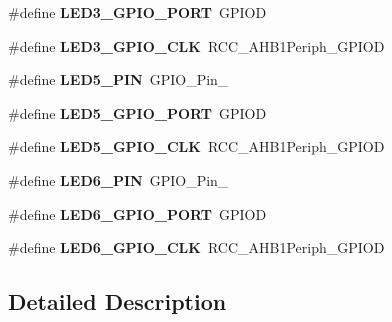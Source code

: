 \begin{DoxyCompactItemize}
\item 
\hypertarget{group___s_t_m32_f4___d_i_s_c_o_v_e_r_y___l_o_w___l_e_v_e_l___l_e_d_ga050f4b3a1f402476f9541dfe975d2143}{\#define {\bfseries L\-E\-D3\-\_\-\-G\-P\-I\-O\-\_\-\-P\-O\-R\-T}~G\-P\-I\-O\-D}\label{group___s_t_m32_f4___d_i_s_c_o_v_e_r_y___l_o_w___l_e_v_e_l___l_e_d_ga050f4b3a1f402476f9541dfe975d2143}

\item 
\hypertarget{group___s_t_m32_f4___d_i_s_c_o_v_e_r_y___l_o_w___l_e_v_e_l___l_e_d_gaf4e64981a3f4584fb771aa4cbc093c61}{\#define {\bfseries L\-E\-D3\-\_\-\-G\-P\-I\-O\-\_\-\-C\-L\-K}~R\-C\-C\-\_\-\-A\-H\-B1\-Periph\-\_\-\-G\-P\-I\-O\-D}\label{group___s_t_m32_f4___d_i_s_c_o_v_e_r_y___l_o_w___l_e_v_e_l___l_e_d_gaf4e64981a3f4584fb771aa4cbc093c61}

\item 
\hypertarget{group___s_t_m32_f4___d_i_s_c_o_v_e_r_y___l_o_w___l_e_v_e_l___l_e_d_ga1461b79814613e21bc6ebb5d8ae6e858}{\#define {\bfseries L\-E\-D5\-\_\-\-P\-I\-N}~G\-P\-I\-O\-\_\-\-Pin\-\_}\label{group___s_t_m32_f4___d_i_s_c_o_v_e_r_y___l_o_w___l_e_v_e_l___l_e_d_ga1461b79814613e21bc6ebb5d8ae6e858}

\item 
\hypertarget{group___s_t_m32_f4___d_i_s_c_o_v_e_r_y___l_o_w___l_e_v_e_l___l_e_d_gae157f2a0e9c947288518e6124b82aa74}{\#define {\bfseries L\-E\-D5\-\_\-\-G\-P\-I\-O\-\_\-\-P\-O\-R\-T}~G\-P\-I\-O\-D}\label{group___s_t_m32_f4___d_i_s_c_o_v_e_r_y___l_o_w___l_e_v_e_l___l_e_d_gae157f2a0e9c947288518e6124b82aa74}

\item 
\hypertarget{group___s_t_m32_f4___d_i_s_c_o_v_e_r_y___l_o_w___l_e_v_e_l___l_e_d_ga8c3cfa11e4916d221e3fc2fc9e24f19e}{\#define {\bfseries L\-E\-D5\-\_\-\-G\-P\-I\-O\-\_\-\-C\-L\-K}~R\-C\-C\-\_\-\-A\-H\-B1\-Periph\-\_\-\-G\-P\-I\-O\-D}\label{group___s_t_m32_f4___d_i_s_c_o_v_e_r_y___l_o_w___l_e_v_e_l___l_e_d_ga8c3cfa11e4916d221e3fc2fc9e24f19e}

\item 
\hypertarget{group___s_t_m32_f4___d_i_s_c_o_v_e_r_y___l_o_w___l_e_v_e_l___l_e_d_ga671c4f0e7ed8fbbfecc92cf6bdd0d588}{\#define {\bfseries L\-E\-D6\-\_\-\-P\-I\-N}~G\-P\-I\-O\-\_\-\-Pin\-\_}\label{group___s_t_m32_f4___d_i_s_c_o_v_e_r_y___l_o_w___l_e_v_e_l___l_e_d_ga671c4f0e7ed8fbbfecc92cf6bdd0d588}

\item 
\hypertarget{group___s_t_m32_f4___d_i_s_c_o_v_e_r_y___l_o_w___l_e_v_e_l___l_e_d_ga60dcbcf75e3ee091c1512f6ca9e00722}{\#define {\bfseries L\-E\-D6\-\_\-\-G\-P\-I\-O\-\_\-\-P\-O\-R\-T}~G\-P\-I\-O\-D}\label{group___s_t_m32_f4___d_i_s_c_o_v_e_r_y___l_o_w___l_e_v_e_l___l_e_d_ga60dcbcf75e3ee091c1512f6ca9e00722}

\item 
\hypertarget{group___s_t_m32_f4___d_i_s_c_o_v_e_r_y___l_o_w___l_e_v_e_l___l_e_d_ga252105acc9518f714ccdce1ef793661e}{\#define {\bfseries L\-E\-D6\-\_\-\-G\-P\-I\-O\-\_\-\-C\-L\-K}~R\-C\-C\-\_\-\-A\-H\-B1\-Periph\-\_\-\-G\-P\-I\-O\-D}\label{group___s_t_m32_f4___d_i_s_c_o_v_e_r_y___l_o_w___l_e_v_e_l___l_e_d_ga252105acc9518f714ccdce1ef793661e}

\end{DoxyCompactItemize}


\subsection{Detailed Description}
